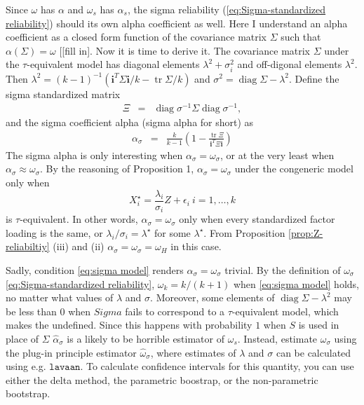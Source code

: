 \documentclass{article}
\theoremstyle{plain}
\theoremstyle{plain}
\theoremstyle{definition}
\theoremstyle{remark}
\theoremstyle{definition}
\theoremstyle{plain}
\theoremstyle{plain}
\theoremstyle{definition}
\DeclareMathOperator{\tr}{tr}
\DeclareMathOperator{\diag}{diag}
\begin{document}
Since $\omega$ has $\alpha$ and $\omega_{s}$ has $\alpha_{s}$,
the sigma reliability (\ref{eq:Sigma-standardized reliability}) should
its own alpha coefficient as well. Here I understand an alpha coefficient
as a closed form function of the covariance matrix $\Sigma$ such
that $\alpha\left(\Sigma\right)=\omega$ {[}{[}fill in{]}. Now it
is time to derive it. The covariance matrix $\Sigma$ under the $\tau$-equivalent
model has diagonal elements $\lambda^{2}+\sigma_{i}^{2}$ and off-digonal
elements $\lambda^{2}$. Then $\lambda^{2}=\left(k-1\right)^{-1}\left(\mathbf{i}^{T}\Sigma\mathbf{i}/k-\tr\Sigma/k\right)$
and $\sigma^{2}=\diag\Sigma-\lambda^{2}$. Define the sigma standardized
matrix
\begin{eqnarray*}
\Xi & = & \diag\sigma^{-1}\Sigma\diag\sigma^{-1},
\end{eqnarray*}
and the sigma coefficient alpha (sigma alpha for short) as
\begin{eqnarray}
\alpha_{\sigma} & = & \frac{k}{k-1}\left(1-\frac{\tr\Xi}{\mathbf{i}^{T}\Xi\mathbf{i}}\right)\label{eq:alpha_sigma-1}
\end{eqnarray}
The sigma alpha is only interesting when $\alpha_{\sigma}=\omega_{\sigma}$,
or at the very least when $\alpha_{\sigma}\approx\omega_{\sigma}$.
By the reasoning of Proposition 1, $\alpha_{\sigma}=\omega_{\sigma}$
under the congeneric model only when 
\begin{equation}
X_{i}^{\star}=\frac{\lambda_{i}}{\sigma_{i}}Z+\epsilon_{i}\:i=1,\ldots,k\label{eq:sigma model}
\end{equation}
is $\tau$-equivalent. In other words, $\alpha_{\sigma}=\omega_{\sigma}$
only when every standardized factor loading is the same, or $\lambda_{i}/\sigma_{i}=\lambda^{\star}$
for some $\lambda^{\star}$. From Proposition \ref{prop:Z-reliabiltiy}
(iii) and (ii) $\alpha_{\sigma}=\omega_{\sigma}=\omega_{H}$ in this
case.

Sadly, condition \eqref{eq:sigma model} renders $\alpha_{\sigma}=\omega_{\sigma}$
trivial. By the definition of $\omega_{\sigma}$ \eqref{eq:Sigma-standardized reliability},
$\omega_{k}=k/\left(k+1\right)$ when \eqref{eq:sigma model} holds, no matter what values of $\lambda$ and $\sigma$.
Moreover, some elements of $\diag\Sigma-\lambda^{2}$ may be less
than $0$ when $Sigma$ fails to correspond to a $\tau$-equivalent model, which makes the undefined. Since this happens with probability $1$ when $S$ is used in place of $\Sigma$ $\widehat{\alpha}_{\sigma}$
is a likely to be horrible estimator of $\omega_{s}$. Instead,
estimate $\omega_{\sigma}$ using the plug-in principle estimator
$\widehat{\omega}_{\sigma}$, where estimates of $\lambda$ and $\sigma$
can be calculated using e.g. $\texttt{lavaan}$. To calculate confidence
intervals for this quantity, you can use either the delta method,
the parametric boostrap, or the non-parametric bootstrap.
\end{document}
